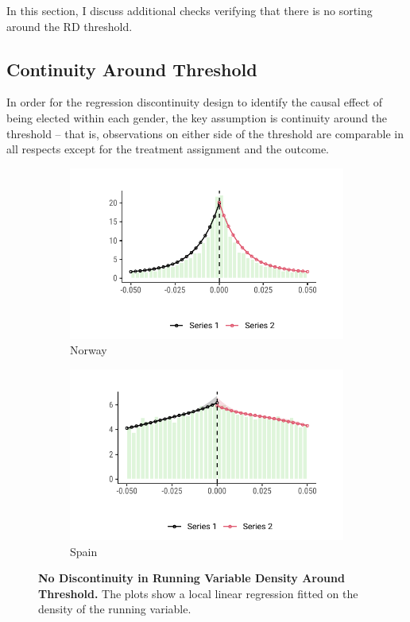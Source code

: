 \documentclass[12pt]{article}
\begin{document}
In this section, I discuss additional checks verifying that there is no sorting around the RD threshold.

\subsection{Continuity Around Threshold}
\label{app:density_checks}

In order for the regression discontinuity design to identify the causal effect of being elected within each gender, the key assumption is continuity around the threshold -- that is, observations on either side of the threshold are comparable in all respects except for the treatment assignment and the outcome.

\begin{figure}[!htb]
    \centering
    \begin{subfigure}[t]{0.48\textwidth}
    \includegraphics[width = 1 \textwidth]{../output/figures/norway_density.pdf}
    \caption{Norway}
    \end{subfigure}%
    \begin{subfigure}[t]{0.48\textwidth}
    \includegraphics[width = 1 \textwidth]{../output/figures/spain_density.pdf}
    \caption{Spain}
    \end{subfigure}
    \caption{\textbf{No Discontinuity in Running Variable Density Around Threshold.} The plots show a local linear regression fitted on the density of the running variable.}
    \label{fig:continuity_assumption}
\end{figure}
\end{document}
